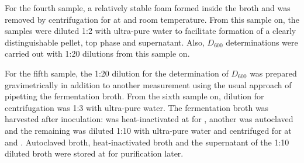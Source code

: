For the fourth sample, a relatively stable foam formed inside the broth and was removed by centrifugation for  at  and room temperature. From this sample on, the samples were diluted 1:2 with ultra-pure water to facilitate formation of a clearly distinguishable pellet, top phase and supernatant. Also, $D_{600}$ determinations were carried out with 1:20 dilutions from this sample on.

For the fifth sample, the 1:20 dilution for the determination of $D_{600}$ was prepared gravimetrically in addition to another measurement using the usual approach of pipetting the fermentation broth. From the sixth sample on, dilution for centrifugation was 1:3 with ultra-pure water. The fermentation broth was harvested  after inoculation:  was heat-inactivated at  for , another  was autoclaved and the remaining  was diluted 1:10 with ultra-pure water and centrifuged for  at  and . Autoclaved broth, heat-inactivated broth and the supernatant of the 1:10 diluted broth were stored at  for purification later.

